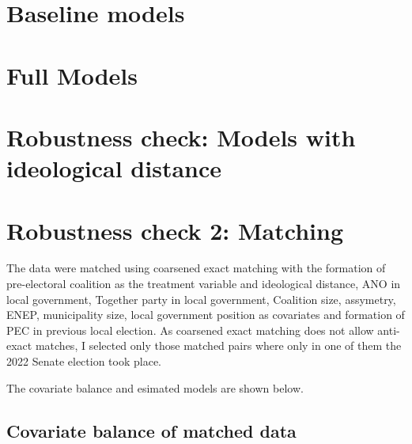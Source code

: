 \documentclass[]{interact}
\theoremstyle{plain}%
\theoremstyle{definition}
\theoremstyle{remark}
\begin{document}
\newpage

\section{Baseline models}
{}

\newpage

\section{Full Models}


\section{Robustness check: Models with ideological distance}
\label{app:1}

{}

\newpage
\section{Robustness check 2: Matching}
\label{app:2}

The data were matched using coarsened exact matching with the formation of pre-electoral coalition as the treatment variable and ideological distance, ANO in local government, Together party in local government, Coalition size, assymetry, ENEP, municipality size, local government position as covariates and formation of PEC in previous local election. 
As coarsened exact matching does not allow anti-exact matches, I selected only those matched pairs where only in one of them the 2022 Senate election took place.

The covariate balance and esimated models are shown below.

\subsection{Covariate balance of matched data \label{tab:4}}
\end{document}
